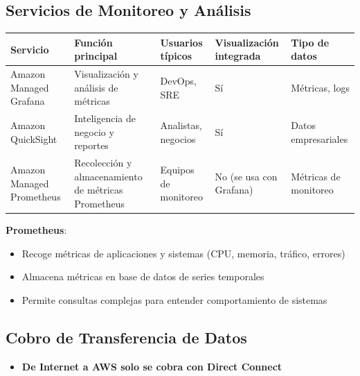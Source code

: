 \documentclass[12pt,a4paper]{report}
\newcommand{\important}[1]{\textcolor{dangerred}{\textbf{#1}}}
\begin{document}
\subsection{Servicios de Monitoreo y Análisis}

\begin{center}
\begin{longtable}{|p{3cm}|p{4cm}|p{2.5cm}|p{2.5cm}|p{2.5cm}|}
\hline
\cellcolor{awsblue!20}\textbf{Servicio} & \cellcolor{awsblue!20}\textbf{Función principal} & \cellcolor{awsblue!20}\textbf{Usuarios típicos} & \cellcolor{awsblue!20}\textbf{Visualización integrada} & \cellcolor{awsblue!20}\textbf{Tipo de datos} \\
\hline
Amazon Managed Grafana & Visualización y análisis de métricas & DevOps, SRE & Sí & Métricas, logs \\
\hline
Amazon QuickSight & Inteligencia de negocio y reportes & Analistas, negocios & Sí & Datos empresariales \\
\hline
Amazon Managed Prometheus & Recolección y almacenamiento de métricas Prometheus & Equipos de monitoreo & No (se usa con Grafana) & Métricas de monitoreo \\
\hline
\end{longtable}
\end{center}

\textbf{Prometheus}:
\begin{itemize}
    \item Recoge métricas de aplicaciones y sistemas (CPU, memoria, tráfico, errores)
    \item Almacena métricas en base de datos de series temporales
    \item Permite consultas complejas para entender comportamiento de sistemas
\end{itemize}

\subsection{Cobro de Transferencia de Datos}

\begin{itemize}
    \item \important{De Internet a AWS solo se cobra con Direct Connect}
\end{itemize}
\end{document}
